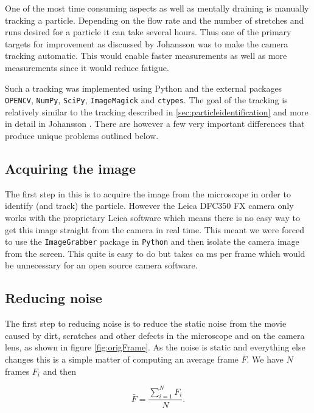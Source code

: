 %
%
%
%
%

One of the most time consuming aspects as well as mentally draining is manually tracking a particle. Depending on the flow rate and the number of stretches and runs desired for a particle it can take several hours. Thus one of the primary targets for improvement as discussed by Johansson \cite{AntonThesis} was to make the camera tracking automatic. This would enable faster measurements as well as more measurements since it would reduce fatigue. 

Such a tracking was implemented using Python and the external packages \texttt{OPENCV}, \texttt{NumPy}, \texttt{SciPy}, \texttt{ImageMagick} and \texttt{ctypes}. The goal of the tracking is relatively similar to the tracking described in \ref{sec:particleidentification} and more in detail in Johansson \cite{AntonThesis}. There are however a few very important differences that produce unique problems outlined below. 

\subsection{Acquiring the image}
The first step in this is to acquire the image from the microscope in order to identify (and track) the particle. However the Leica DFC350 FX camera only works with the proprietary Leica software which means there is no easy way to get this image straight from the camera in real time. This meant we were forced to use the \texttt{ImageGrabber} package in \texttt{Python} and then isolate the camera image from the screen. This quite is easy to do but takes ca \unit[50]{ms} per frame which would be unnecessary for an open source camera software. 

\subsection{Reducing noise}
The first step to reducing noise is to reduce the static noise from the movie caused by dirt, scratches and other defects in the microscope and on the camera lens, as shown in figure \ref{fig:origFrame}. As the noise is static and everything else changes this is a simple matter of computing an average frame $\bar{F}$. We have $N$ frames $F_i$ and then 

\begin{equation}\label{eq:averageFrame}
\bar{F} = \frac{\sum\limits_{i=1}^{N} F_i}{N}.
\end{equation}

